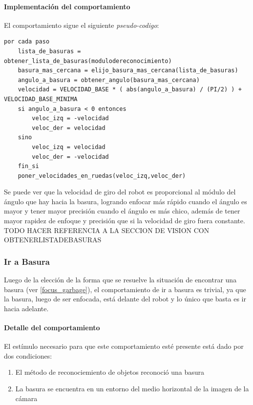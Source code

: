 \paragraph{Implementaci\'on del comportamiento}
\label{focus_garbage:impl}
El comportamiento sigue el siguiente \emph{pseudo-codigo}:
\begin{verbatim}
por cada paso
    lista_de_basuras = obtener_lista_de_basuras(modulodereconocimiento)
    basura_mas_cercana = elijo_basura_mas_cercana(lista_de_basuras)
    angulo_a_basura = obtener_angulo(basura_mas_cercana)
    velocidad = VELOCIDAD_BASE * ( abs(angulo_a_basura) / (PI/2) ) + VELOCIDAD_BASE_MINIMA
    si angulo_a_basura < 0 entonces
        veloc_izq = -velocidad
        veloc_der = velocidad
    sino
        veloc_izq = velocidad
        veloc_der = -velocidad
    fin_si
    poner_velocidades_en_ruedas(veloc_izq,veloc_der)
\end{verbatim}

Se puede ver que la velocidad de giro del robot es proporcional al m\'odulo del \'angulo
que hay hacia la basura, logrando enfocar m\'as r\'apido cuando el \'angulo es mayor y
tener mayor precisi\'on cuando el \'angulo es m\'as chico, adem\'as de tener mayor rapidez
de enfoque y precisi\'on que si la velocidad de giro fuera constante.
\\
TODO HACER REFERENCIA A LA SECCION DE VISION CON OBTENERLISTADEBASURAS

\subsubsection{Ir a Basura}
\label{go_to_garbage}
Luego de la elecci\'on de la forma que se resuelve la situaci\'on de encontrar una
basura (ver \ref{focus_garbage}), el comportamiento de ir a basura es trivial, ya
que la basura, luego de ser enfocada, est\'a delante del robot y lo \'unico que
basta es ir hacia adelante.

\paragraph{Detalle del comportamiento}
El est\'imulo necesario para que este comportamiento est\'e presente est\'a
dado por dos condiciones:
\begin{enumerate}
\item El m\'etodo de reconociemiento de objetos reconoci\'o una basura
\item La basura se encuentra en un entorno del medio horizontal de la imagen de la c\'amara
\end{enumerate}

